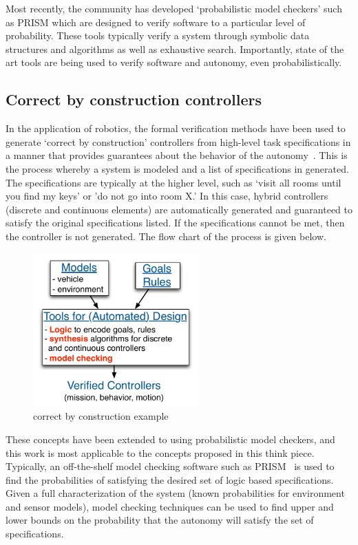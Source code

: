 Most recently, the community has developed `probabilistic model checkers' such as PRISM \cite{Kwiatkowska2001,prism} which are designed to verify software to a particular level of probability. These tools typically verify a system through symbolic data structures and algorithms as well as exhaustive search. Importantly, state of the art tools are being used to verify software and autonomy, even probabilistically.

\subsection*{Correct by construction controllers}

In the application of robotics, the formal verification methods have been used to generate `correct by construction' controllers from high-level task specifications in a manner that provides guarantees about the behavior of the autonomy~\cite{mishra_95,FKGPcdc_05,kress2009temporal,Wongpiromsarn2011}. This is the process whereby a system is modeled and a list of specifications in generated. The specifications are typically at the higher level, such as `visit all rooms until you find my keys' or 'do not go into room X.' In this case, hybrid controllers (discrete and continuous elements) are automatically generated and guaranteed to satisfy the original specifications listed. If the specifications cannot be met, then the controller is not generated. The flow chart of the process is given below. 

\begin{figure}[h] 
\centering
   \includegraphics[width=2.5in]{correct-by-construction.pdf} 
   \caption{correct by construction example}
   \label{fig:correct-by-construction}
\end{figure}

These concepts have been extended to using probabilistic model checkers, and this work is most applicable to the concepts proposed in this think piece. Typically, an off-the-shelf model checking software such as PRISM~\cite{Kwiatkowska2001,prism} is used to find the probabilities of satisfying the desired set of logic based specifications. Given a full characterization of the system (known probabilities for environment and sensor models), model checking techniques can be used to find upper and lower bounds on the probability that the autonomy will satisfy the set of specifications.

